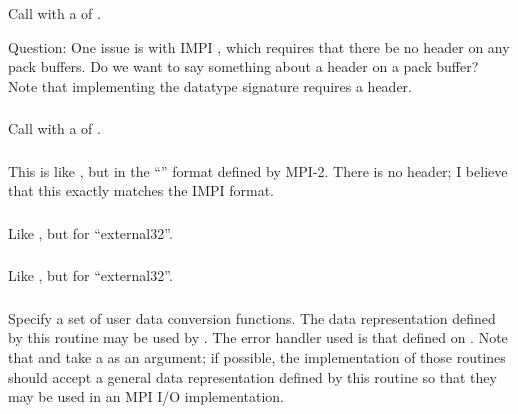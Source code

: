 \documentclass{article}
\begin{document}
\subsubsection{}
Call  with a  of .

Question: One issue is with IMPI \cite{impi}, which requires that there be no
header on any pack buffers.  Do we want to say something about a header on a
pack buffer?  Note that implementing the datatype signature
\cite{gro:mpi-datatypes:pvmmpi00} requires a header. 

\subsubsection{}
Call  with a  of .

\subsubsection{}
This is like , but in the ``'' format
defined by MPI-2.  There is no header; I believe that this exactly matches the
IMPI format.

\subsubsection{}
Like , but for ``external32''.

\subsubsection{}
Like , but for ``external32''.

\subsubsection{}
Specify a set of user data conversion functions.  The data representation
defined by this routine may be used by .  The error
handler used is that defined on .  Note that
 and  take a
 as an argument; if possible, the implementation of those
routines should accept a general data representation defined by this routine
so that they may be used in an MPI I/O implementation.
\end{document}
